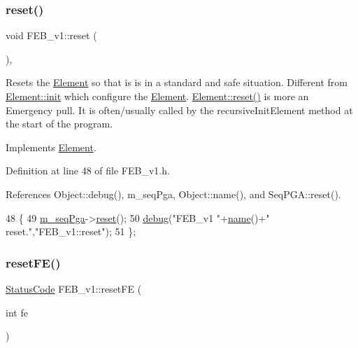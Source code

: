 \subsubsection{\texorpdfstring{reset()}{reset()}}
{\footnotesize\ttfamily void F\+E\+B\+\_\+v1\+::reset (\begin{DoxyParamCaption}{ }\end{DoxyParamCaption})\hspace{0.3cm}{\ttfamily [inline]}, {\ttfamily [virtual]}}

Resets the \hyperlink{classElement}{Element} so that is is in a standard and safe situation. Different from \hyperlink{classElement_af42754b5cabc198869222725218d695c}{Element\+::init} which configure the \hyperlink{classElement}{Element}. \hyperlink{classElement_a69efffa22f06909d768149715565cb56}{Element\+::reset()} is more an Emergency pull. It is often/usually called by the recursive\+Init\+Element method at the start of the program. 

Implements \hyperlink{classElement_a69efffa22f06909d768149715565cb56}{Element}.



Definition at line 48 of file F\+E\+B\+\_\+v1.\+h.



References Object\+::debug(), m\+\_\+seq\+Pga, Object\+::name(), and Seq\+P\+G\+A\+::reset().


\begin{DoxyCode}
48                \{
49     \hyperlink{classFEB__v1_a6c7804ac86796f233a8393043adf2e77}{m\_seqPga}->\hyperlink{classSeqPGA_aaadcbdd7ad7c96d2d69549b820da6809}{reset}();
50     \hyperlink{classObject_aac010553f022165573714b7014a15f0d}{debug}(\textcolor{stringliteral}{"FEB\_v1 "}+\hyperlink{classObject_a300f4c05dd468c7bb8b3c968868443c1}{name}()+\textcolor{stringliteral}{" reset."},\textcolor{stringliteral}{"FEB\_v1::reset"});
51   \};
\end{DoxyCode}
\mbox{\label{classFEB__v1_ae351e55f3d8e8f936c324ffbda6816bf}} 
\subsubsection{\texorpdfstring{reset\+F\+E()}{resetFE()}}
{\footnotesize\ttfamily \hyperlink{classStatusCode}{Status\+Code} F\+E\+B\+\_\+v1\+::reset\+FE (\begin{DoxyParamCaption}\item[{int}]{fe }\end{DoxyParamCaption})}



